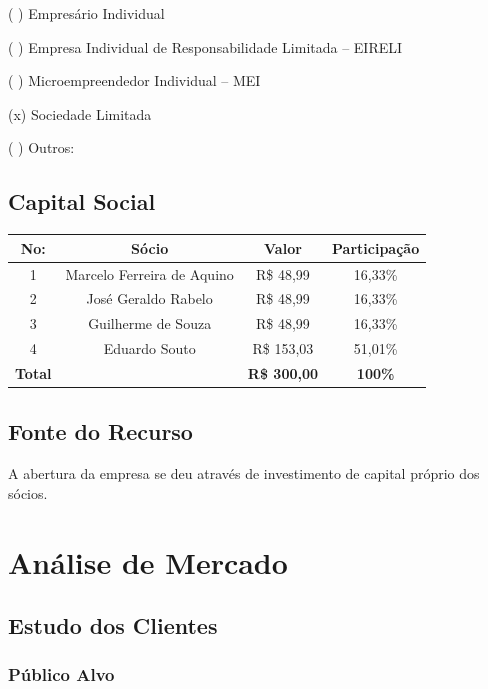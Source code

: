 \documentclass[
	12pt,				%
	openright,			%
	twoside,			%
	a4paper,			%
	english,			%
	french,				%
	spanish,			%
	brazil,				%
	]{abntex2}
\begin{document}
( ) Empresário Individual

( ) Empresa Individual de Responsabilidade Limitada – EIRELI

( ) Microempreendedor Individual – MEI

(x) Sociedade Limitada

( ) Outros:

\section{Capital Social}

\begin{center}
	\begin{tabular}{|c|c|c|c|}
		\hline
		\textbf{No:}	& \textbf{Sócio}				& \textbf{Valor} & \textbf{Participação} \\ \hline
		1				& Marcelo Ferreira de Aquino 	& R\$ 48,99 & 16,33\% \\ \hline
		2				& José Geraldo Rabelo 			& R\$ 48,99 & 16,33\% \\ \hline
		3				& Guilherme de Souza 			& R\$ 48,99 & 16,33\% \\ \hline
		4				& Eduardo Souto 				& R\$ 153,03 & 51,01\% \\ \hline
		\textbf{Total}	& 	 							& \textbf{R\$ 300,00} & \textbf{100\% }\\ \hline
	\end{tabular}
\end{center}

\section{Fonte do Recurso}

A abertura da empresa se deu através de investimento de capital próprio dos sócios.



\chapter{Análise de Mercado}

\section{Estudo dos Clientes}

\subsection{Público Alvo}
\end{document}
